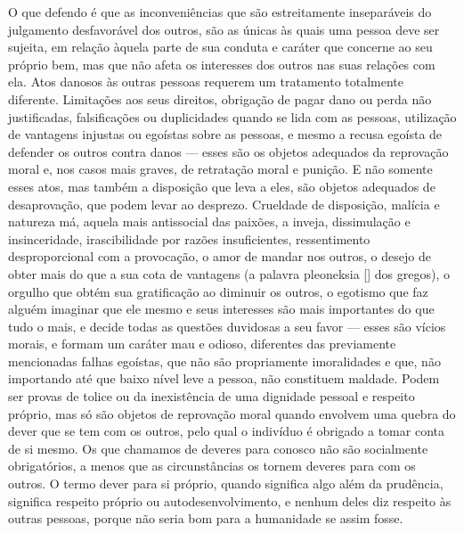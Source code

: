 O que defendo é que as inconveniências que são estreitamente
inseparáveis do julgamento desfavorável dos outros, são as únicas às
quais uma pessoa deve ser sujeita, em relação àquela parte de sua
conduta e caráter que concerne ao seu próprio bem, mas que não afeta os
interesses dos outros nas suas relações com ela. Atos danosos às outras
pessoas requerem um tratamento totalmente diferente. Limitações aos
seus direitos, obrigação de pagar dano ou perda não justificadas,
falsificações ou duplicidades quando se lida com as pessoas, utilização
de vantagens injustas ou egoístas sobre as pessoas, e mesmo a recusa
egoísta de defender os outros contra danos --- esses são os objetos
adequados da reprovação moral e, nos casos mais graves, de retratação
moral e punição. E não somente esses atos, mas também a disposição que
leva a eles, são objetos adequados de desaprovação, que podem levar ao
desprezo. Crueldade de disposição, malícia e natureza má, aquela mais
antissocial das paixões, a inveja, dissimulação e insinceridade,
irascibilidade por razões insuficientes, ressentimento desproporcional
com a provocação, o amor de mandar nos outros, o desejo de obter mais
do que a sua cota de vantagens (a palavra pleoneksia [] dos gregos), o
orgulho que obtém sua gratificação ao diminuir os outros, o egotismo
que faz alguém imaginar que ele mesmo e seus interesses são mais importantes do que
tudo o mais, e decide todas as questões duvidosas a seu favor --- esses
são vícios morais, e formam um caráter mau e odioso, diferentes das
previamente mencionadas falhas egoístas, que não são propriamente
imoralidades e que, não importando até que baixo nível leve a pessoa,
não constituem maldade. Podem ser provas de tolice ou da inexistência
de uma dignidade pessoal e respeito próprio, mas só são objetos de
reprovação moral quando envolvem uma quebra do dever que se tem com os
outros, pelo qual o indivíduo é obrigado a tomar conta de si mesmo. Os
que chamamos de deveres para conosco não são socialmente obrigatórios,
a menos que as circunstâncias os tornem deveres para com os outros. O
termo dever para si próprio, quando significa algo além da prudência,
significa respeito próprio ou autodesenvolvimento, e nenhum deles
diz respeito às outras pessoas, porque não seria bom para a humanidade se assim fosse.

